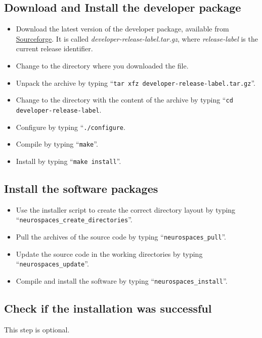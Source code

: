 \documentclass[12pt]{article}
\begin{document}
\subsection*{Download and Install the developer package}

\begin{itemize}
   \item[] Download the latest version of the developer package, available from \href{http://sourceforge.net/projects/neurospaces/files/}{Sourceforge}. It is called {\it developer-release-label.tar.gz}, where {\it release-label} is the current release identifier.
   \item[] Change to the directory where you downloaded the file.
   \item[] Unpack the archive by typing ``{\tt tar xfz developer-release-label.tar.gz}''.
   \item[] Change to the directory with the content of the archive by typing ``{\tt cd developer-release-label}.
   \item[] Configure by typing ``{\tt ./configure}.
   \item[] Compile by typing ``{\tt make}''.
   \item[] Install by typing ``{\tt make install}''. 
\end{itemize}

\subsection*{Install the software packages}

\begin{itemize}
   \item[] Use the installer script to create the correct directory layout by typing ``{\tt neurospaces\_create\_directories}''.
   \item[] Pull the archives of the source code by typing ``{\tt neurospaces\_pull}''.
   \item[] Update the source code in the working directories by typing ``{\tt neurospaces\_update}''.
   \item[] Compile and install the software by typing ``{\tt neurospaces\_install}''.
\end{itemize}

\subsection*{Check if the installation was successful}

This step is optional.
\end{document}
